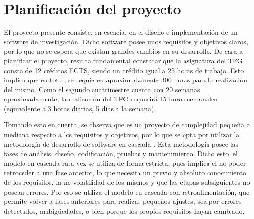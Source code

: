\section{Planificación del proyecto}


El proyecto presente consiste, en esencia, en el diseño e implementación de un software de investigación. Dicho software posee unos requisitos y objetivos claros, por lo que no se espera que existan grandes cambios en su desarrollo. De cara a planificar el proyecto, resulta fundamental constatar que la asignatura del TFG consta de 12 créditos ECTS, siendo un crédito igual a 25 horas de trabajo. Esto implica que en total, se requieren aproximadamente 300 horas para la realización del mismo. Como el segundo cuatrimestre cuenta con 20 semanas aproximadamente, la realización del TFG requerirá 15 horas semanales (equivalente a 3 horas diarias, 5 días a la semana).

Tomando esto en cuenta, se observa que es un proyecto de complejidad pequeña a mediana respecto a los requisitos y objetivos, por lo que se opta por utilizar la metodología de desarrollo de software en cascada \cite{pressman2005software}. Esta metodología posee las fases de análisis, diseño, codificación, pruebas y mantenimiento. Dicho esto, el modelo en cascada rara vez se utiliza de forma estricta, pues implica el no poder retroceder a una fase anterior, lo que necesita un previo y absoluto conocimiento de los requisitos, la no volatilidad de los mismos y que las etapas subsiguientes no posean errores. Por eso se utiliza el modelo en cascada con retroalimentación, que permite volver a fases anteriores para realizar pequeños ajustes, sea por errores detectados, ambigüedades, o bien porque los propios requisitos hayan cambiado.

